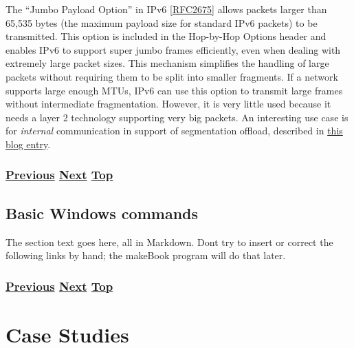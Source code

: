 \documentclass[
]{article}
\begin{document}
The ``Jumbo Payload Option'' in IPv6
{[}\href{https://www.rfc-editor.org/info/rfc2675}{RFC2675}{]} allows
packets larger than 65,535 bytes (the maximum payload size for standard
IPv6 packets) to be transmitted. This option is included in the
Hop-by-Hop Options header and enables IPv6 to support super jumbo frames
efficiently, even when dealing with extremely large packet sizes. This
mechanism simplifies the handling of large packets without requiring
them to be split into smaller fragments. If a network supports large
enough MTUs, IPv6 can use this option to transmit large frames without
intermediate fragmentation. However, it is very little used because it
needs a layer 2 technology supporting very big packets. An interesting
use case is for \emph{internal} communication in support of segmentation
offload, described in
\href{https://www.sipanda.io/post/segmentation-offload-and-protocols-let-s-be-friends}{this
blog entry}.

\subsubsection{\texorpdfstring{\hyperref[energy-consumption]{Previous}
\hyperref[basic-windows-commands]{Next}
\hyperref[management-and-operations]{Top}}{Previous Next Top}}\label{previous-next-top-33}

\pagebreak

\subsection{Basic Windows commands}\label{basic-windows-commands}

The section text goes here, all in Markdown. Don\textquotesingle t try
to insert or correct the following links by hand; the makeBook program
will do that later.

\subsubsection{\texorpdfstring{\hyperref[packet-size-and-jumbo-frames]{Previous}
\hyperref[case-studies]{Next}
\hyperref[management-and-operations]{Top}}{Previous Next Top}}\label{previous-next-top-34}

\pagebreak

\section{Case Studies}\label{case-studies}
\end{document}
